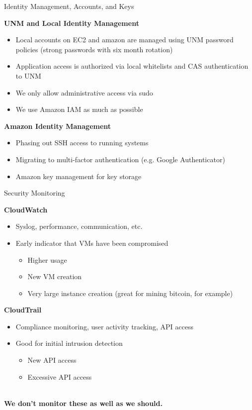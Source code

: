 \documentclass[t,handout]{beamer}   %
\begin{document}
\begin{frame}{Identity Management, Accounts, and Keys}

\textbf{UNM and Local Identity Management}
{\small
\begin{itemize}
\item Local accounts on EC2 and amazon are managed using UNM password policies (strong passwords with six month rotation)
\item Application access is authorized via local whitelists and CAS authentication to UNM
\item We only allow administrative access via sudo
\item We use Amazon IAM as much as possible
\end{itemize}
}

\textbf{Amazon Identity Management}
{\small
\begin{itemize}
\item Phasing out SSH access to running systems
\item Migrating to multi-factor authentication (e.g. Google Authenticator)~
\item Amazon key management for key storage
\end{itemize}
}
\end{frame}

\begin{frame}{Security Monitoring}

\textbf{CloudWatch}
{\small
\begin{itemize}
\item Syslog, performance, communication, etc.
\item Early indicator that VMs have been compromised
\begin{itemize}
\item Higher usage
\item New VM creation
\item Very large instance creation (great for mining bitcoin, for example)
\end{itemize}
\end{itemize}
}

\textbf{CloudTrail}
{\small
\begin{itemize}
\item Compliance monitoring, user activity tracking, API access
\item Good for initial intrusion detection
\begin{itemize}
\item New API access
\item Excessive API access
\end{itemize}
\end{itemize}
}
~\\
\centering
\textbf{We don't monitor these as well as we should.}
\end{frame}
\end{document}
